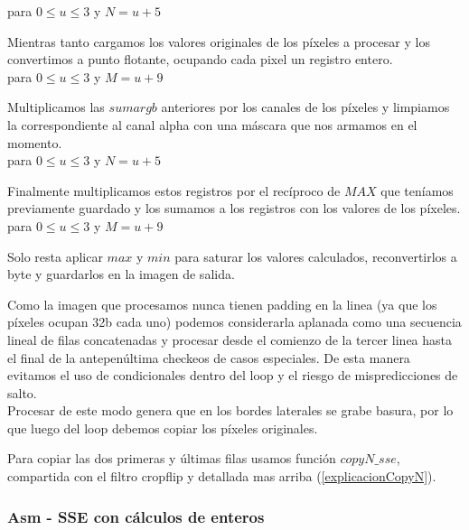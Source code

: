  
para $0 \le u \le 3$ y $N = u+5$

Mientras tanto cargamos los valores originales de los píxeles a procesar y los convertimos a punto flotante, ocupando cada pixel un registro entero. \\

 
para $0 \le u \le 3$ y $M = u+9$

Multiplicamos las $sumargb$ anteriores por los canales de los píxeles y limpiamos la correspondiente al canal alpha con una máscara que nos armamos en el momento. \\

 
para $0 \le u \le 3$ y $N = u+5$

Finalmente multiplicamos estos registros por el recíproco de $MAX$ que teníamos previamente guardado y los sumamos a los registros con los valores de los píxeles. \\

 
para $0 \le u \le 3$ y $M = u+9$

Solo resta aplicar $max$ y $min$ para saturar los valores calculados, reconvertirlos a byte y guardarlos en la imagen de salida.

\vspace{10 mm}

Como la imagen que procesamos nunca tienen padding en la linea (ya que los píxeles ocupan 32b cada uno) podemos considerarla aplanada como una secuencia lineal de filas concatenadas y procesar desde el comienzo de la tercer linea hasta el final de la antepenúltima checkeos de casos especiales.
De esta manera evitamos el uso de condicionales dentro del loop y el riesgo de mispredicciones de salto. \\
Procesar de este modo genera que en los bordes laterales se grabe basura, por lo que luego del loop debemos copiar los píxeles originales.

Para copiar las dos primeras y últimas filas usamos función $copyN\_sse$, compartida con el filtro cropflip y detallada mas arriba (\ref{explicacionCopyN}).

\subsubsection{Asm - SSE con cálculos de enteros}

